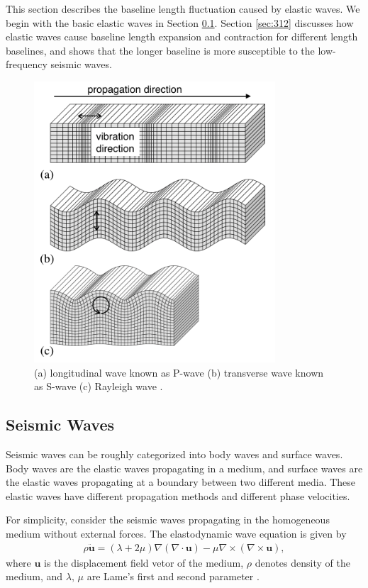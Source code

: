 This section describes the baseline length fluctuation caused by elastic waves. We begin with the basic elastic waves in Section \cref{sec:311}. Section \cref{sec:312} discusses how elastic waves cause baseline length expansion and contraction for different length baselines, and shows that the longer baseline is more susceptible to the low-frequency seismic waves.

\begin{figure}[h]
  \begin{center}
    \includegraphics[width=9.0cm]{./img_chap3/img303.png}
    \caption{(a) longitudinal wave known as P-wave (b) transverse wave known as S-wave (c) Rayleigh wave \cite{shearer_2009}.
    }\label{img:img303}    
  \end{center}
\end{figure}


\subsection{Seismic Waves}\label{sec:311}
Seismic waves can be roughly categorized into body waves and surface waves. Body waves are the elastic waves propagating in a medium, and surface waves are the elastic waves propagating at a boundary between two different media. These elastic waves have different propagation methods and different phase velocities.

For simplicity, consider the seismic waves propagating in the homogeneous medium without external forces. The elastodynamic wave equation is given by 
\begin{eqnarray}\label{eq:eq_1}
  \rho{\bm{\ddot{u}}} = (\lambda+2\mu)\nabla(\nabla\cdot\bm{u}) - \mu\nabla\times(\nabla\times\bm{u}),
\end{eqnarray}
where $\bm{u}$ is the displacement field vetor of the medium, $\rho$ denotes density of the medium, and $\lambda,\,\mu$ are Lame's first and second parameter \cite{hasegawa2015jishin}.

